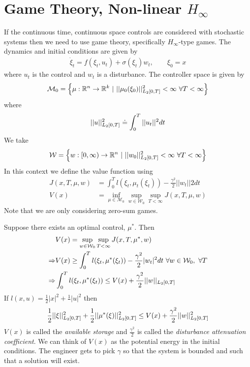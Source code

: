 \section{Game Theory, Non-linear $H_\infty$}
If the continuous time, continuous space controls are considered with stochastic systems then we need to use game theory, specifically $H_\infty$-type games.
The dynamics and initial conditions are given by
\begin{align*}
\dot{\xi}_t = f(\xi_t,u_t) + \sigma(\xi_t)w_t, \qquad \xi_0=x
\end{align*}
where $u_t$ is the control and $w_t$ is a disturbance. The controller space is given by
$$\mathcal{M}_0 = \left\lbrace \mu:\mathbb{R}^n\to\mathbb{R}^k ~|~ ||\mu_0(\xi_0)||^2_{L_2[0,T]}<\infty ~\forall T<\infty\right\rbrace$$
where
$$||u||^2_{L_2[0,T]}\doteq\int_0^T||u_t||^2dt$$
We take
$$\mathcal{W}=\left\lbrace w:[0,\infty)\to\mathbb{R}^n ~|~ ||w_0||^2_{L_2[0,T]}<\infty ~\forall T<\infty \right\rbrace$$
In this context we define the value function using
\begin{align*}
J(x,T,\mu,w) &= \int_0^Tl(\xi_t,\mu_t(\xi_t)) - \frac{\gamma^2}{2}||w_t||2dt \\
V(x) &= \inf_{\mu\in\mathcal{M}_0}\sup_{w\in\mathcal{W}_0}\sup_{T<\infty} J(x,T,\mu,w)
\end{align*}
Note that we are only considering zero-sum games.

Suppose there exists an optimal control, $\mu^\ast$. Then
\begin{align*}
&V(x) = \sup_{w\in\mathcal{W}_0}\sup_{T<\infty}J(x,T,\mu^\ast,w) \\
\Rightarrow &V(x) \geq \int_0^Tl(\xi_t,\mu^\ast(\xi_t)) - \frac{\gamma^2}{2}|w_t|^2dt ~\forall w\in\mathcal{W}_0, ~\forall T \\
\Rightarrow &\int_0^Tl(\xi_t,\mu^\ast(\xi_t)) \leq V(x) + \frac{\gamma^2}{2}||w||_{L_2[0,T]}
\end{align*}
If $l(x,u)  = \frac{1}{2}|x|^2+\frac{1}{}|u|^2$ then
$$\frac{1}{2}||\xi||^2_{L_2[0,T]} + \frac{1}{2}||\mu^\ast(\xi)||_{L_2[0,T]}^2 \leq V(x) + \frac{\gamma^2}{2}||w||^2_{L_2[0,T]}$$
$V(x)$ is called the \textit{available storage} and $\frac{\gamma^2}{2}$ is called the \textit{disturbance attenuation coefficient}. We can think of $V(x)$ as the potential energy in the initial conditions. The engineer gets to pick $\gamma$ so that the system is bounded and such that a solution will exist.

